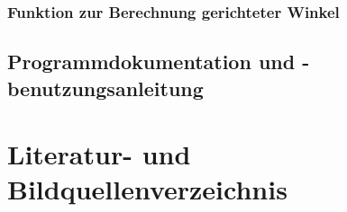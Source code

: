 \documentclass[reducespace,stylepage,semiarbeit]{spezidoc}
\begin{document}
\begin{equation*}
\begin{split}
\end{split}
\end{equation*}

\begin{subequations}
\begin{align}
\end{align}
\end{subequations}

\subsubsection*{Funktion zur Berechnung gerichteter Winkel}


\subsection{Programmdokumentation und -benutzungsanleitung}

\newpage
\section{Literatur- und Bildquellenverzeichnis}



\eidesstattlicheerklaerung
\end{document}
